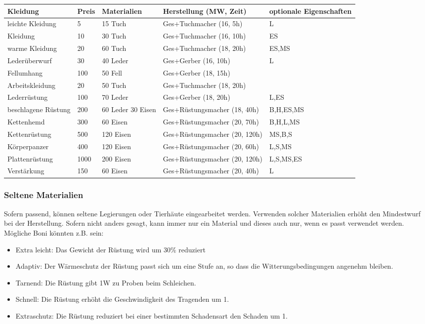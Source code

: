 \documentclass{article}
\begin{document}
\begin{small}
\begin{tabular}{|m{25mm}|m{1cm}|m{3cm}|m{5cm}|m{30mm}|}
\hline
\textbf{Kleidung}&\textbf{Preis}&\textbf{Materialien}&\textbf{Herstellung (MW, Zeit)}&\textbf{optionale Eigenschaften}\\
\hline
\hline
leichte Kleidung&5&15 Tuch&Ges+Tuchmacher (16, 5h)&L\\
\hline
Kleidung&10&30 Tuch&Ges+Tuchmacher (16, 10h)&ES\\
\hline
warme Kleidung&20&60 Tuch&Ges+Tuchmacher (18, 20h)&ES,MS\\
\hline
Lederüberwurf&30&40 Leder&Ges+Gerber (16, 10h)&L\\
\hline
Fellumhang&100&50 Fell&Ges+Gerber (18, 15h)& \\
\hline
Arbeitskleidung&20&50 Tuch&Ges+Tuchmacher (18, 20h)& \\
\hline
Lederrüstung&100&70 Leder&Ges+Gerber (18, 20h)&L,ES\\
\hline
beschlagene Rüstung&200&60 Leder 30 Eisen&Ges+Rüstungsmacher (18, 40h)&B,H,ES,MS\\
\hline
Kettenhemd&300&60 Eisen&Ges+Rüstungsmacher (20, 70h)&B,H,L,MS\\
\hline
Kettenrüstung&500&120 Eisen&Ges+Rüstungsmacher (20, 120h)&MS,B,S\\
\hline
Körperpanzer&400&120 Eisen&Ges+Rüstungsmacher (20, 60h)&L,S,MS\\
\hline
Plattenrüstung&1000&200 Eisen&Ges+Rüstungsmacher (20, 120h)&L,S,MS,ES\\
\hline
Verstärkung&150&60 Eisen&Ges+Rüstungsmacher (20, 40h)&L\\
\hline
\end{tabular}
\end{small}

\subsubsection{Seltene Materialien}

Sofern passend, können seltene Legierungen oder Tierhäute eingearbeitet werden. Verwenden solcher Materialien erhöht
den Mindestwurf bei der Herstellung. Sofern nicht anders gesagt, kann immer nur ein Material und dieses auch nur,
wenn es passt verwendet werden. Mögliche Boni könnten z.B. sein:

\begin{itemize}
\item Extra leicht: Das Gewicht der Rüstung wird um 30\% reduziert
\item Adaptiv: Der Wärmeschutz der Rüstung passt sich um eine Stufe an, so dass die Witterungsbedingungen angenehm bleiben.
\item Tarnend: Die Rüstung gibt 1W zu Proben beim Schleichen.
\item Schnell: Die Rüstung erhöht die Geschwindigkeit des Tragenden um 1.
\item Extraschutz: Die Rüstung reduziert bei einer bestimmten Schadensart den Schaden um 1.
\end{itemize}
\end{document}
